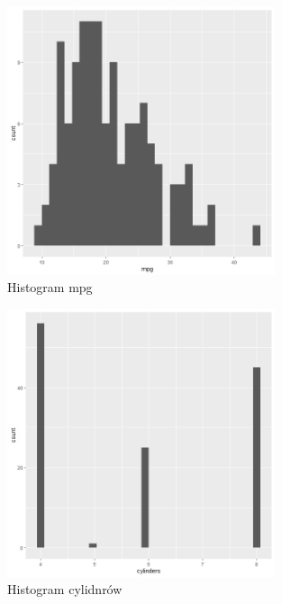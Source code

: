 \documentclass{article}
\begin{document}
            \begin{figure}[H]
                \caption{Histogram mpg}
                \centering
                \includegraphics[width=0.7\textwidth]{../histograms/mpg_hist.jpeg}
            \end{figure}
            \begin{figure}[H]
                \caption{Histogram cylidnrów}
                \centering
                \includegraphics[width=0.7\textwidth]{../histograms/cylinders_hist.jpeg}
            \end{figure}
\end{document}
